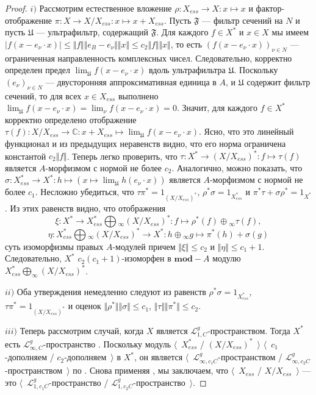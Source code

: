\documentclass[12pt]{article}
\begin{document}
\begin{proof} $i)$ Рассмотрим естественное вложение $\rho:X_{ess}\to X:x\mapsto x$ и фактор-отображение $\pi:X\to X/X_{ess}:x\mapsto x+X_{ess}$. Пусть $\mathfrak{F}$ --- фильтр сечений на $N$ и пусть $\mathfrak{U}$ --- ультрафильтр, содержащий $\mathfrak{F}$. Для каждого $f\in X ^*$ и $x\in X $ мы имеем $|f(x-e_\nu\cdot x)|\leq\Vert f\Vert\Vert e_B - e_\nu\Vert\Vert x\Vert\leq c_2\Vert f\Vert\Vert x\Vert$, то есть $(f(x-e_\nu\cdot x))_{\nu\in N}$ --- ограниченная направленность комплексных чисел. Следовательно, корректно определен предел $\lim_{\mathfrak{U}}f(x-e_\nu\cdot x)$ вдоль ультрафильтра $\mathfrak{U}$. Поскольку $(e_\nu)_{\nu\in N}$ --- двусторонняя аппроксимативная единица в $A$, и $\mathfrak{U}$ содержит фильтр сечений, то для всех $x\in X_{ess}$ выполнено $\lim_{\mathfrak{U}}f(x-e_\nu\cdot x)=\lim_{\nu}f(x-e_\nu\cdot x)=0$. Значит, для каждого $f\in X ^*$ корректно определено отображение $\tau(f):X /X_{ess}\to \mathbb{C}:x+X_{ess}\mapsto \lim_{\mathfrak{U}} f(x-e_\nu\cdot x)$. Ясно, что это линейный функционал и из предыдущих неравенств видно, что его норма ограничена константой $c_2\Vert f\Vert$. Теперь легко проверить, что $\tau:X^*\to (X/ X_{ess})^*:f\mapsto \tau(f)$ является $A$-морфизмом с нормой не более $c_2$. Аналогично, можно показать, что $\sigma:X_{ess}^*\to X^*:h\mapsto(x\mapsto \lim_{\mathfrak{U}}h(e_\nu\cdot x))$ является $A$-морфизмом с нормой не более $c_1$. Несложно убедиться, что $\tau \pi^*=1_{(X/X_{ess})^*}$, $\rho^*\sigma=1_{X_{ess}^*}$ и  $\pi^*\tau+\sigma\rho^*=1_{X^*}$. Из этих равенств видно, что отображения
\[
\xi:X^*\to X_{ess}^*\bigoplus{}_\infty (X/X_{ess})^*:f\mapsto \rho^*(f)\oplus{}_\infty \tau(f),
\]
\[
\eta:X_{ess}^*\bigoplus{}_\infty (X/X_{ess})^*\to X^*:h\oplus{}_\infty g\mapsto \pi^*(h)+\sigma(g)
\]
суть изоморфизмы правых $A$-модулей причем $\Vert\xi \Vert\leq c_2$ и $\Vert \eta\Vert\leq c_1+1$. Следовательно, $X^*$ $c_2(c_1+1)$-изоморфен в $\mathbf{mod}-A$ модулю $X_{ess}^*\bigoplus_\infty (X/X_{ess})^*$.

$ii)$ Оба утверждения немедленно следуют из равенств $\rho^*\sigma=1_{X_{ess}^*}$, $\tau \pi^*=1_{(X/X_{ess})^*}$ и оценок $\Vert \rho^*\Vert\Vert \sigma\Vert\leq c_1$, $\Vert\tau\Vert\Vert \pi^*\Vert\leq c_2$.

$iii)$ Теперь рассмотрим случай, когда $X$ является $\mathcal{L}_{1,C}^g$-пространством. Тогда $X^*$ есть $\mathcal{L}_{\infty,C}^g$-пространство \cite[следствие 23.2.1(1)]{DefFloTensNorOpId}. Поскольку модуль $\langle$~$X_{ess}^*$ / $(X/X_{ess})^*$~$\rangle$ $\langle$~$c_1$-дополняем / $c_2$-дополняем~$\rangle$ в $X^*$, он является $\langle$~$\mathcal{L}_{\infty,c_1C}^g$-пространством / $\mathcal{L}_{\infty,c_2C}^g$-пространством~$\rangle$ по \cite[следствие 23.2.1(1)]{DefFloTensNorOpId}. Снова применяя \cite[следствие 23.2.1(1)]{DefFloTensNorOpId}, мы заключаем, что $\langle$~$X_{ess}$  / $X/X_{ess}$~$\rangle$ --- это $\langle$~$\mathcal{L}_{1,c_1C}^g$-пространство / $\mathcal{L}_{1,c_2C}^g$-пространство~$\rangle$.
\end{proof}
\end{document}
